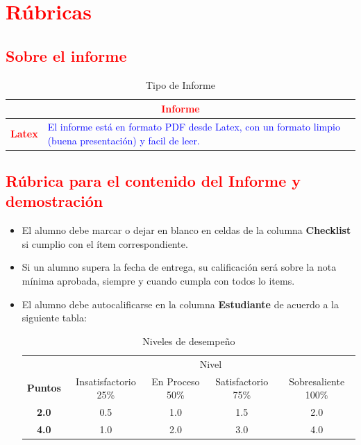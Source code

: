 \documentclass{article}
\begin{document}
	\section{\textcolor{red}{Rúbricas}}
	
	\subsection{\textcolor{red}{Sobre el informe}}
	\begin{table}[H]
		\caption{Tipo de Informe}
		\setlength{\tabcolsep}{0.5em} %
		{\renewcommand{\arraystretch}{1.5}%
		\begin{tabular}{|p{3cm}|p{12cm}|}
			\hline
			\multicolumn{2}{|c|}{\textbf{\textcolor{red}{Informe}}}  \\
			\hline 
			\textbf{\textcolor{red}{Latex}} & \textcolor{blue}{El informe está en formato PDF desde Latex,  con un formato limpio (buena presentación) y facil de leer.}   \\ 
			\hline 
			
			
		\end{tabular}
	}
	\end{table}
	
	\clearpage

	\subsection{\textcolor{red}{Rúbrica para el contenido del Informe y demostración}}
	\begin{itemize}			
		\item El alumno debe marcar o dejar en blanco en celdas de la columna \textbf{Checklist} si cumplio con el ítem correspondiente.
		\item Si un alumno supera la fecha de entrega,  su calificación será sobre la nota mínima aprobada, siempre y cuando cumpla con todos lo items.
		\item El alumno debe autocalificarse en la columna \textbf{Estudiante} de acuerdo a la siguiente tabla:
	
		\begin{table}[ht]
			\caption{Niveles de desempeño}
			\begin{center}
			\begin{tabular}{ccccc}
    			\hline
    			 & \multicolumn{4}{c}{Nivel}\\
    			\cline{1-5}
    			\textbf{Puntos} & Insatisfactorio 25\%& En Proceso 50\% & Satisfactorio 75\% & Sobresaliente 100\%\\
    			\textbf{2.0}&0.5&1.0&1.5&2.0\\
    			\textbf{4.0}&1.0&2.0&3.0&4.0\\
    		\hline
			\end{tabular}
		\end{center}
	\end{table}	
	
	\end{itemize}
	
\end{document}

